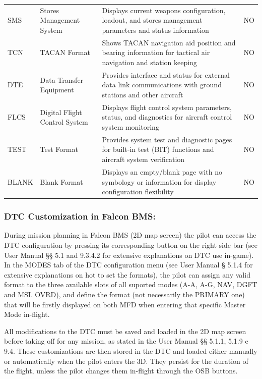 \documentclass[11pt, a4paper, twoside]{report}
\begin{document}
\begin{longtable}{L{1.8cm} L{5.5cm} L{6.5cm} L{2.5cm}}
	SMS & Stores Management System & Displays current weapons configuration, loadout, and stores management parameters and status information & NO \\
	
	TCN & TACAN Format & Shows TACAN navigation aid position and bearing information for tactical air navigation and station keeping & NO \\
	
	DTE & Data Transfer Equipment & Provides interface and status for external data link communications with ground stations and other aircraft & NO \\
	
	FLCS & Digital Flight Control System & Displays flight control system parameters, status, and diagnostics for aircraft control system monitoring & NO \\
	
	TEST & Test Format & Provides system test and diagnostic pages for built-in test (BIT) functions and aircraft system verification & NO \\
	
	BLANK & Blank Format & Displays an empty/blank page with no symbology or information for display configuration flexibility & NO \\
	
\end{longtable}
\subsubsection{DTC Customization in Falcon BMS:}
\label{sec:C4-S4-S2-S2}

During mission planning in Falcon BMS (2D map screen) the pilot can access the DTC configuration by pressing its corresponding button on the right side bar (see User Manual §§ 5.1 and 9.3.4.2 for extensive explanations on DTC use in-game). In the MODES tab of the DTC configuration menu (see User Manual § 5.1.4 for extensive explanations on hot to set the formats), the pilot can assign any valid format to the three available slots of all suported modes (A-A, A-G, NAV, DGFT and MSL OVRD), and define the format (not necessarily the PRIMARY one) that will be firstly displayed on both MFD when entering that specific Master Mode in-flight.

All modifications to the DTC must be saved and loaded in the 2D map screen before taking off for any mission, as stated in the User Manual §§ 5.1.1, 5.1.9 e 9.4. These customizations are then stored in the DTC and loaded either manually or automatically when the pilot enters the 3D. They persist for the duration of the flight, unless the pilot changes them in-flight through the OSB buttons.
\end{document}
